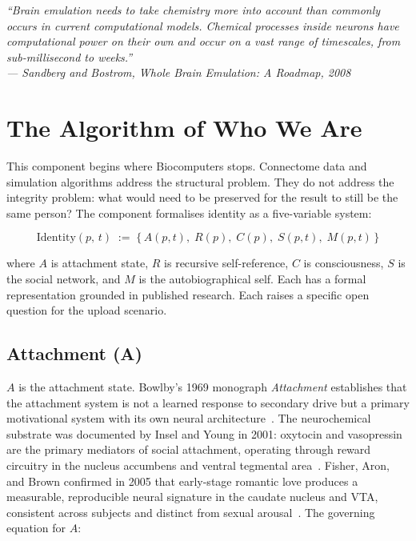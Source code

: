 \documentclass[12pt, a4paper]{article}
\begin{document}
\begin{displayquote}
\itshape
``Brain emulation needs to take chemistry more into account than commonly occurs in current
computational models. Chemical processes inside neurons have computational power on their own and
occur on a vast range of timescales, from sub-millisecond to weeks.''\\
\upshape --- Sandberg and Bostrom, \textit{Whole Brain Emulation: A Roadmap}, 2008~\cite{Bio-7}
\end{displayquote}

\section{The Algorithm of Who We Are}

This component begins where Biocomputers stops. Connectome data and simulation algorithms address the
structural problem. They do not address the integrity problem: what would need to be preserved for the
result to still be the same person? The component formalises identity as a five-variable system:

\begin{equation}
\mathrm{Identity}(p,\,t) \;:=\; \{\, A(p,t),\; R(p),\; C(p),\; S(p,t),\; M(p,t) \,\}
\end{equation}

where $A$ is attachment state, $R$ is recursive self-reference, $C$ is consciousness, $S$ is the
social network, and $M$ is the autobiographical self. Each has a formal representation grounded in
published research. Each raises a specific open question for the upload scenario.

\subsection*{Attachment (A)}

$A$ is the attachment state. Bowlby's 1969 monograph \textit{Attachment} establishes that the
attachment system is not a learned response to secondary drive but a primary motivational system with
its own neural architecture~\cite{Alg-1}. The neurochemical substrate was documented by Insel and
Young in 2001: oxytocin and vasopressin are the primary mediators of social attachment, operating
through reward circuitry in the nucleus accumbens and ventral tegmental area~\cite{Alg-2}. Fisher,
Aron, and Brown confirmed in 2005 that early-stage romantic love produces a measurable, reproducible
neural signature in the caudate nucleus and VTA, consistent across subjects and distinct from sexual
arousal~\cite{Alg-3}. The governing equation for $A$:
\end{document}
